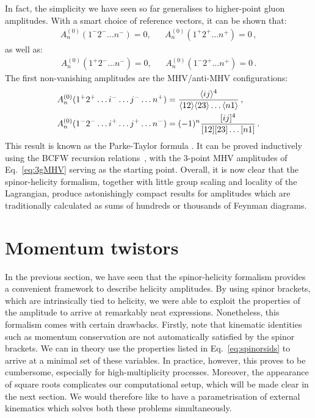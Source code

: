 \documentclass[main.tex]{subfiles}
\begin{document}
In fact, the simplicity we have seen so far generalises to higher-point gluon amplitudes. With a smart choice of reference vectors, it can be shown that:
\begin{align}
    A_n^{(0)} (1^-2^- \ldots n^-) = 0, && A_n^{(0)} (1^+2^+ \ldots n^+) = 0\,,
\end{align}
as well as:
\begin{align}
    A_n^{(0)} (1^+2^- \ldots n^-) = 0, && A_n^{(0)} (1^-2^+ \ldots n^+) = 0\,.
\end{align}
The first non-vanishing amplitudes are the MHV/anti-MHV configurations:
\begin{align} \label{eq:ParkeTaylor}
    A_n^{(0)} (1^+2^+\ldots i^- \ldots j^- \ldots n^+) &= \frac{\langle ij \rangle^4}{\langle 12 \rangle \langle 23 \rangle \ldots \langle n1 \rangle} \,, \\
    A_n^{(0)} (1^-2^-\ldots i^+ \ldots j^+ \ldots n^-) &= (-1)^n \frac{[ ij ]^4}{[ 12 ] [ 23 ] \ldots [ n1 ]} \,.
\end{align}
This result is known as the Parke-Taylor formula \cite{parketaylor, Mangano:1990by}. It can be proved inductively using the BCFW recursion relations~\cite{Britto:2004ap, Britto:2005fq}, with the 3-point MHV amplitudes of Eq.~\ref{eq:3gMHV} serving as the starting point. Overall, it is now clear that the spinor-helicity formalism, together with little group scaling and locality of the Lagrangian, produce astonishingly compact results for amplitudes which are traditionally calculated as sums of hundreds or thousands of Feynman diagrams.
\section{Momentum twistors} \label{sec:MTs}
In the previous section, we have seen that the spinor-helicity formalism provides a convenient framework to describe helicity amplitudes. By using spinor brackets, which are intrinsically tied to helicity, we were able to exploit the properties of the amplitude to arrive at remarkably neat expressions. Nonetheless, this formalism comes with certain drawbacks. Firstly, note that kinematic identities such as momentum conservation are not automatically satisfied by the spinor brackets. We can in theory use the properties listed in Eq.~\ref{eq:spinorsids} to arrive at a minimal set of these variables. In practice, however, this proves to be cumbersome, especially for high-multiplicity processes. Moreover, the appearance of square roots 
complicates our computational setup, which will be made clear in the next section. We would therefore like to have a parametrisation of external kinematics which solves both these problems simultaneously.
\end{document}
